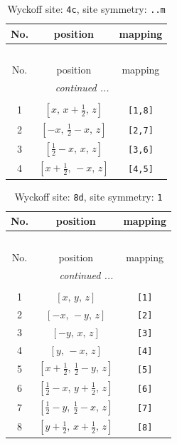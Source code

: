 \documentclass[fleqn,8pt]{jsarticle}
\begin{document}
\renewcommand{\arraystretch}{1.2}
\begin{longtable}{ccc}
\caption{Wyckoff site: {\tt 4c}, site symmetry: {\tt ..m}}
 \\
 \hline \hline
No. & position & mapping \\ \hline \endfirsthead

\multicolumn{2}{l}{\tablename\ \thetable{}} \\
 \hline \hline
No. & position & mapping \\ \hline \endhead

 \hline \hline
\multicolumn{2}{r}{\footnotesize\it continued ...} \\ \endfoot

 \hline \hline
\multicolumn{2}{r}{} \\ \endlastfoot

1 & $\left[ x,\, x + \frac{1}{2},\, z \right]$ & {\tt [1,8]} \\ \hline
2 & $\left[ - x,\, \frac{1}{2} - x,\, z \right]$ & {\tt [2,7]} \\ \hline
3 & $\left[ \frac{1}{2} - x,\, x,\, z \right]$ & {\tt [3,6]} \\ \hline
4 & $\left[ x + \frac{1}{2},\, - x,\, z \right]$ & {\tt [4,5]} \\
\end{longtable}
\renewcommand{\arraystretch}{1.2}
\begin{longtable}{ccc}
\caption{Wyckoff site: {\tt 8d}, site symmetry: {\tt 1}}
 \\
 \hline \hline
No. & position & mapping \\ \hline \endfirsthead

\multicolumn{2}{l}{\tablename\ \thetable{}} \\
 \hline \hline
No. & position & mapping \\ \hline \endhead

 \hline \hline
\multicolumn{2}{r}{\footnotesize\it continued ...} \\ \endfoot

 \hline \hline
\multicolumn{2}{r}{} \\ \endlastfoot

1 & $\left[ x,\, y,\, z \right]$ & {\tt [1]} \\ \hline
2 & $\left[ - x,\, - y,\, z \right]$ & {\tt [2]} \\ \hline
3 & $\left[ - y,\, x,\, z \right]$ & {\tt [3]} \\ \hline
4 & $\left[ y,\, - x,\, z \right]$ & {\tt [4]} \\ \hline
5 & $\left[ x + \frac{1}{2},\, \frac{1}{2} - y,\, z \right]$ & {\tt [5]} \\ \hline
6 & $\left[ \frac{1}{2} - x,\, y + \frac{1}{2},\, z \right]$ & {\tt [6]} \\ \hline
7 & $\left[ \frac{1}{2} - y,\, \frac{1}{2} - x,\, z \right]$ & {\tt [7]} \\ \hline
8 & $\left[ y + \frac{1}{2},\, x + \frac{1}{2},\, z \right]$ & {\tt [8]} \\
\end{longtable}
\end{document}
